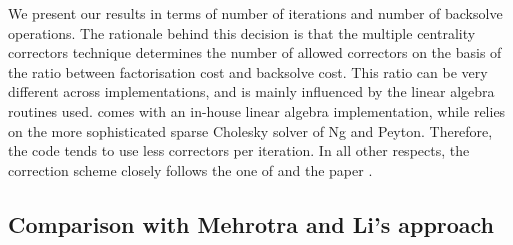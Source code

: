 We present our results in terms of number of iterations and number 
of backsolve operations. The rationale behind this decision is that 
the multiple centrality correctors technique determines the number 
of allowed correctors on the basis of the ratio between factorisation 
cost and backsolve cost. This ratio can be very different across 
implementations, and is mainly influenced by the linear algebra 
routines used. 
\HOPDM comes with an in-house linear algebra implementation, while
\PCx relies on the more sophisticated sparse Cholesky solver
of Ng and Peyton. Therefore, the \PCx code tends to use less 
correctors per iteration.
In all other respects, the correction scheme closely follows the one
of \HOPDM and the paper \cite{Gondzio96}.

%
%
\subsection{Comparison with Mehrotra and Li's approach}
\label{ML-tests}


